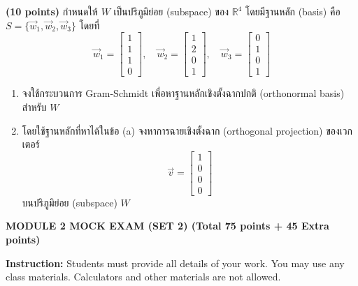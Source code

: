 ﻿\documentclass[12pt, a4paper]{exam}
\begin{document}
\begin{questions}
\question \textbf{(10 points)} กำหนดให้ $W$ เป็นปริภูมิย่อย (subspace) ของ $\mathbb{R}^4$ โดยมีฐานหลัก (basis) คือ $S = \{\vec{w}_1, \vec{w}_2, \vec{w}_3\}$ โดยที่
\[
\vec{w}_1 = \begin{bmatrix} 1 \\ 1 \\ 1 \\ 0 \end{bmatrix}, \quad
\vec{w}_2 = \begin{bmatrix} 1 \\ 2 \\ 0 \\ 1 \end{bmatrix}, \quad
\vec{w}_3 = \begin{bmatrix} 0 \\ 1 \\ 0 \\ 1 \end{bmatrix}
\]
\begin{enumerate}[label=(\alph*)]
    \item จงใช้กระบวนการ Gram-Schmidt เพื่อหาฐานหลักเชิงตั้งฉากปกติ (orthonormal basis) สำหรับ $W$
    \item โดยใช้ฐานหลักที่หาได้ในข้อ (a) จงหาการฉายเชิงตั้งฉาก (orthogonal projection) ของเวกเตอร์
    \[
    \vec{v} = \begin{bmatrix} 1 \\ 0 \\ 0 \\ 0 \end{bmatrix}
    \]
    บนปริภูมิย่อย (subspace) $W$
\end{enumerate}

\end{questions}

\newpage
\begin{center}
    \textbf{\Large MODULE 2 MOCK EXAM (SET 2) (Total 75 points + 45 Extra points)}
\end{center}
\vspace{0.2cm}
\noindent \textbf{Instruction:} Students must provide all details of your work. You may use any class materials. Calculators and other materials are not allowed.
\vspace{0.5cm}
\end{document}
